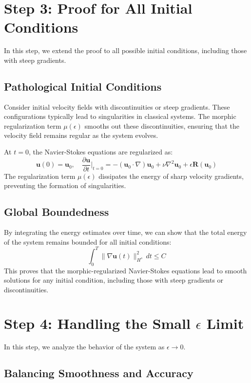 \documentclass{article}
\begin{document}
\begin{itemize}
\section*{Step 3: Proof for All Initial Conditions}

In this step, we extend the proof to all possible initial conditions, including those with steep gradients.

\subsection*{Pathological Initial Conditions}

Consider initial velocity fields with discontinuities or steep gradients. These configurations typically lead to singularities in classical systems. The morphic regularization term \( \mu(\epsilon) \) smooths out these discontinuities, ensuring that the velocity field remains regular as the system evolves.

At \( t = 0 \), the Navier-Stokes equations are regularized as:
\[
\mathbf{u}(0) = \mathbf{u}_0, \quad \frac{\partial \mathbf{u}}{\partial t}\Big|_{t=0} = -(\mathbf{u}_0 \cdot \nabla)\mathbf{u}_0 + \nu \nabla^2 \mathbf{u}_0 + \epsilon \mathbf{R}(\mathbf{u}_0)
\]
The regularization term \( \mu(\epsilon) \) dissipates the energy of sharp velocity gradients, preventing the formation of singularities.

\subsection*{Global Boundedness}

By integrating the energy estimates over time, we can show that the total energy of the system remains bounded for all initial conditions:
\[
\int_0^T \|\nabla \mathbf{u}(t)\|_{H^s}^2 \, dt \leq C
\]
This proves that the morphic-regularized Navier-Stokes equations lead to smooth solutions for any initial condition, including those with steep gradients or discontinuities.

\section*{Step 4: Handling the Small \(\epsilon\) Limit}

In this step, we analyze the behavior of the system as \( \epsilon \to 0 \).

\subsection*{Balancing Smoothness and Accuracy}


\end{itemize}
\end{document}
